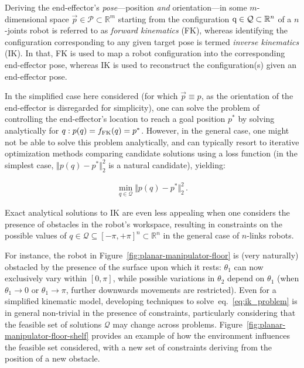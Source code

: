 Deriving the end-effector's \emph{pose}---position \emph{and} orientation---in some \(m\)-dimensional space \( \vec{p} \in \mathcal{P} \subset \mathbb{R}^{m} \) starting from the configuration \( {\textnormal{q}} \in \mathcal Q \subset \mathbb R^n \) of a \( n \)-joints robot is referred to as \emph{forward kinematics} (FK), whereas identifying the configuration corresponding to any given target pose is termed \emph{inverse kinematics} (IK).
In that, FK is used to map a robot configuration into the corresponding end-effector pose, whereas IK is used to reconstruct the configuration(s) given an end-effector pose.

In the simplified case here considered (for which \( \vec{p} \equiv p \), as the orientation of the end-effector is disregarded for simplicity), one can solve the problem of controlling the end-effector's location to reach a goal position \( p^* \) by solving analytically for \( q: p(q) = f_{\text{FK}}(q) = p^*\).
However, in the general case, one might not be able to solve this problem analytically, and can typically resort to iterative optimization methods comparing candidate solutions using a loss function (in the simplest case, \( \Vert p(q) - p^* \Vert_2^2 \) is a natural candidate), yielding:

\begin{align}
\min_{q \in \mathcal Q} \Vert p(q) - p^* \Vert_2^2 \, .
\label{eq:ik_problem}
\end{align}

Exact analytical solutions to IK are even less appealing when one considers the presence of obstacles in the robot's workspace, resulting in constraints on the possible values of \( q \in \mathcal Q \subseteq [-\pi, +\pi]^n \subset \mathbb R^n \) in the general case of \(n\)-links robots.

For instance, the robot in Figure~\ref{fig:planar-manipulator-floor} is (very naturally) obstacled by the presence of the surface upon which it rests: \( \theta_1 \) can now exclusively vary within \([0,  \pi] \), while possible variations in \( \theta_2 \) depend on \( \theta_1 \) (when \( \theta_1 \to 0 \) or \( \theta_1 \to \pi \), further downwards movements are restricted).
Even for a simplified kinematic model, developing techniques to solve~eq.~\ref{eq:ik_problem} is in general non-trivial in the presence of constraints, particularly considering that the feasible set of solutions \( \mathcal Q \) may change across problems.
Figure~\ref{fig:planar-manipulator-floor-shelf} provides an example of how the environment influences the feasible set considered, with a new set of constraints deriving from the position of a new obstacle.

